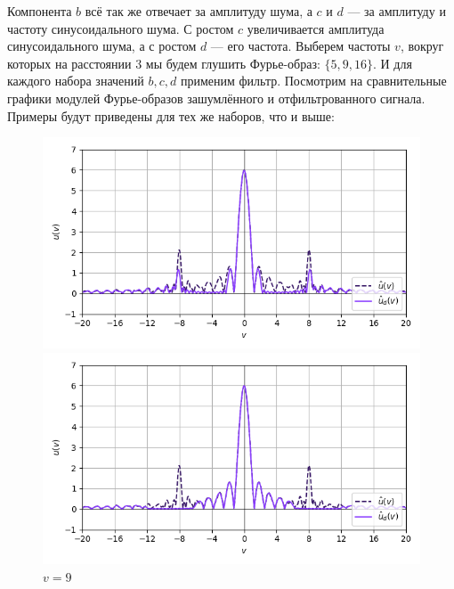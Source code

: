\documentclass[a4paper]{article}
\begin{document}
Компонента $b$ всё так же отвечает за амплитуду шума, а $c$ и $d$ --- за амплитуду и частоту синусоидального шума. С ростом $c$ увеличивается амплитуда синусоидального шума, а с ростом $d$ --- его частота.\newpage
Выберем частоты $v$, вокруг которых на расстоянии $3$ мы будем глушить Фурье-образ: $\{5, 9, 16\}$. И для каждого набора значений $b, c, d$ применим фильтр. Посмотрим на сравнительные графики модулей Фурье-образов зашумлённого и отфильтрованного сигнала. Примеры будут приведены для тех же наборов, что и выше:
\begin{figure}[H]
    \begin{minipage}{0.33\textwidth}
        \centering \includegraphics[width=\textwidth]{sources/band-stop filter/fourier (b=0, c=0.8, d=8, v=5).png}
        \caption{$v = 5$}
    \end{minipage}\hfill
    \begin{minipage}{0.33\textwidth}
        \centering \includegraphics[width=\textwidth]{sources/band-stop filter/fourier (b=0, c=0.8, d=8, v=9).png}
        \caption{$v = 9$}
    \end{minipage}\hfill
    \begin{minipage}{0.33\textwidth}

\end{minipage}
\end{figure}
\end{document}
